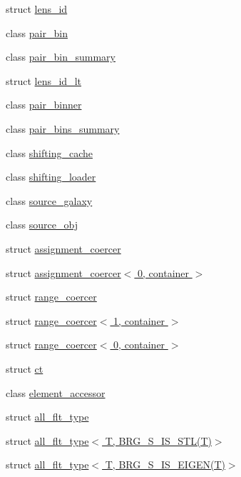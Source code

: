 \begin{DoxyCompactItemize}
\item 
struct \hyperlink{structIceBRG_1_1lens__id}{lens\-\_\-id}
\item 
class \hyperlink{classIceBRG_1_1pair__bin}{pair\-\_\-bin}
\item 
class \hyperlink{classIceBRG_1_1pair__bin__summary}{pair\-\_\-bin\-\_\-summary}
\item 
struct \hyperlink{structIceBRG_1_1lens__id__lt}{lens\-\_\-id\-\_\-lt}
\item 
class \hyperlink{classIceBRG_1_1pair__binner}{pair\-\_\-binner}
\item 
class \hyperlink{classIceBRG_1_1pair__bins__summary}{pair\-\_\-bins\-\_\-summary}
\item 
class \hyperlink{classIceBRG_1_1shifting__cache}{shifting\-\_\-cache}
\item 
class \hyperlink{classIceBRG_1_1shifting__loader}{shifting\-\_\-loader}
\item 
class \hyperlink{classIceBRG_1_1source__galaxy}{source\-\_\-galaxy}
\item 
class \hyperlink{classIceBRG_1_1source__obj}{source\-\_\-obj}
\item 
struct \hyperlink{structIceBRG_1_1assignment__coercer}{assignment\-\_\-coercer}
\item 
struct \hyperlink{structIceBRG_1_1assignment__coercer_3_010_00_01container_01_4}{assignment\-\_\-coercer$<$ 0, container $>$}
\item 
struct \hyperlink{structIceBRG_1_1range__coercer}{range\-\_\-coercer}
\item 
struct \hyperlink{structIceBRG_1_1range__coercer_3_011_00_01container_01_4}{range\-\_\-coercer$<$ 1, container $>$}
\item 
struct \hyperlink{structIceBRG_1_1range__coercer_3_010_00_01container_01_4}{range\-\_\-coercer$<$ 0, container $>$}
\item 
struct \hyperlink{structIceBRG_1_1ct}{ct}
\item 
class \hyperlink{classIceBRG_1_1element__accessor}{element\-\_\-accessor}
\item 
struct \hyperlink{namespaceIceBRG_structIceBRG_1_1all__flt__type}{all\-\_\-flt\-\_\-type}
\item 
struct \hyperlink{structIceBRG_1_1all__flt__type_3_01T_00_01BRG__S__IS__STL_07T_08_4}{all\-\_\-flt\-\_\-type$<$ T, B\-R\-G\-\_\-\-S\-\_\-\-I\-S\-\_\-\-S\-T\-L(\-T)$>$}
\item 
struct \hyperlink{structIceBRG_1_1all__flt__type_3_01T_00_01BRG__S__IS__EIGEN_07T_08_4}{all\-\_\-flt\-\_\-type$<$ T, B\-R\-G\-\_\-\-S\-\_\-\-I\-S\-\_\-\-E\-I\-G\-E\-N(\-T)$>$}

\end{DoxyCompactItemize}
